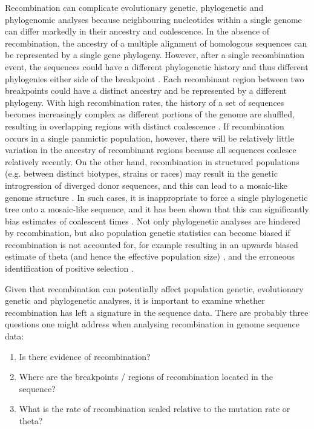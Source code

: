 Recombination can complicate evolutionary genetic, phylogenetic and phylogenomic analyses because neighbouring nucleotides within a single genome can differ markedly in their ancestry and coalescence.
In the absence of recombination, the ancestry of a multiple alignment of homologous sequences can be represented by a single gene phylogeny. 
However, after a single recombination event, the sequences could have a different phylogenetic history and thus different phylogenies either side of the breakpoint \parencite{Lemey2009c}.
Each recombinant region between two breakpoints could have a distinct ancestry and be represented by a different phylogeny.
With high recombination rates, the history of a set of sequences becomes increasingly complex as different portions of the genome are shuffled, resulting in overlapping regions with distinct coalescence \parencite{Jouet2015}.
If recombination occurs in a single panmictic population, however, there will be relatively little variation in the ancestry of recombinant regions because all sequences coalesce relatively recently.
On the other hand, recombination in structured populations (e.g. between distinct biotypes, strains or races) may result in the genetic introgression of diverged donor sequences, and this can lead to a mosaic-like genome structure \parencite{McMullan2015a}.
In such cases, it is inappropriate to force a single phylogenetic tree onto a mosaic-like sequence, and it has been shown that this can significantly bias estimates of coalescent times \parencite{Jouet2015}.
Not only phylogenetic analyses are hindered by recombination, but also population genetic statistics can become biased if recombination is not accounted for, for example resulting in an upwards biased estimate of theta (and hence the effective population size) \parencite{McVean2002,Watterson1975}, and the erroneous identification of positive selection \parencite{SHRINER2003}.

Given that recombination can potentially affect population genetic, evolutionary genetic and phylogenetic analyses, it is important to examine whether recombination has left a signature in the sequence data. There are probably three questions one might address when analysing recombination in genome sequence data:

\begin{enumerate}
	\item Is there evidence of recombination?
    \item Where are the breakpoints / regions of recombination located in the sequence?
    \item What is the rate of recombination scaled relative to the mutation rate or theta?
\end{enumerate}

